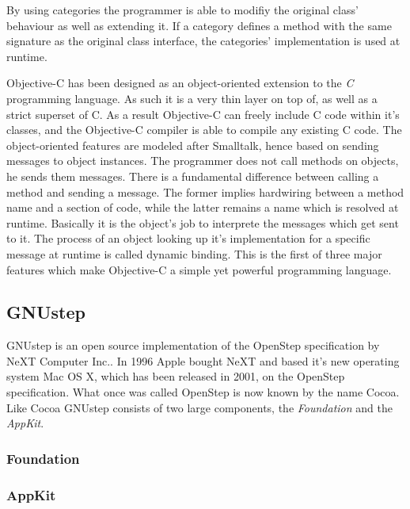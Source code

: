 By using categories the programmer is able to modifiy the original class'
behaviour as well as extending it. If a category defines a method with the same
signature as the original class interface, the categories' implementation is
used at runtime.






Objective-C has been designed as an object-oriented extension to the
\textit{C} programming language. As such it is a very thin layer on top of, as
well as a strict superset of C. As a result Objective-C can freely include C
code within it's classes, and the Objective-C compiler is able to compile any
existing C code. The object-oriented features are modeled after Smalltalk, hence
based on sending messages to object instances. The programmer does not call
methods on objects, he sends them messages. There is a fundamental difference
between calling a method and sending a message. The former implies hardwiring
between a method name and a section of code, while the latter remains a name
which is resolved at runtime. Basically it is the object's job to interprete
the messages which get sent to it. The process of an object looking up it's
implementation for a specific message at runtime is called dynamic binding. This
is the first of three major features which make Objective-C a simple yet
powerful programming language.

\subsection{GNUstep}
GNUstep is an open source implementation of the OpenStep
specification\cite{misc:OpenStepSpec} by NeXT Computer Inc.\cite{misc:NeXT}. In
1996 Apple bought NeXT and based it's new operating system Mac OS X, which has
been released in 2001, on the OpenStep specification. What once was called
OpenStep is now known by the name Cocoa. Like Cocoa GNUstep consists of two
large components, the \textit{Foundation} and the \textit{AppKit}.

\subsubsection{Foundation}

\subsubsection{AppKit}

